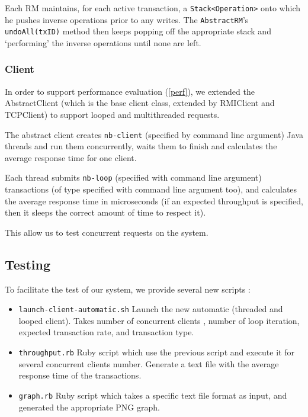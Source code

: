 \documentclass[a4paper]{article}
\begin{document}
Each RM maintains, for each active transaction, a \texttt{Stack<Operation>} onto which he pushes inverse operations prior to any writes. The \texttt{AbstractRM}'s \texttt{undoAll(txID)} method then keeps popping off the appropriate stack
and `performing' the inverse operations until none are left. 

\subsubsection{Client}

In order to support performance evaluation (\ref{perf}), we extended the AbstractClient (which is the base client class, extended by RMIClient and TCPClient) to support looped and multithreaded requests.

The abstract client creates \texttt{nb-client} (specified by command line argument) Java threads and run them concurrently, waits them to finish and calculates the average response time for one client.

Each thread submits \texttt{nb-loop} (specified with command line argument) transactions (of type specified with command line argument too), and calculates the average response time in microseconds (if an expected throughput is specified, then it sleeps the correct amount of time to respect it).

This allow us to test concurrent requests on the system.
\subsection{Testing}

To facilitate the test of our system, we provide several new scripts :
\begin{itemize}
\item
{\tt launch-client-automatic.sh}
Launch the new automatic (threaded and looped client). Takes number of concurrent clients , number of loop iteration, expected transaction rate, and transaction type.

\item

{\tt throughput.rb}
Ruby script which use the previous script and execute it for several concurrent clients number. Generate a text file with the average response time of the transactions.

\item
{\tt graph.rb}
Ruby script which takes a specific text file format as input, and generated the appropriate PNG graph.
\end{itemize}
\end{document}
